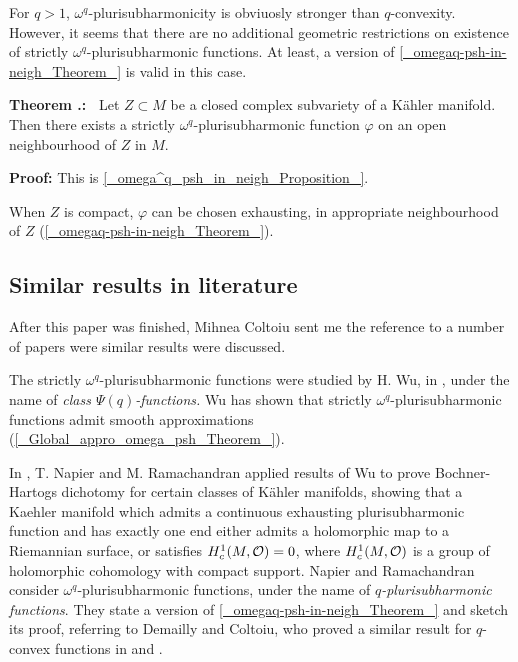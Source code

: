 \documentclass[11pt]{article}
\numberwithin{equation}{section}
\newcommand{\6}{\partial}
\renewcommand{\c}[1]{{\cal #1}}
\newcommand{\calo}{{\cal O}}
\renewcommand{\phi}{\varphi}
\newcounter{Mycounter}[section]
\newcounter{theorem}[section]
\renewcommand{\thetheorem}{{Theorem \thesection.\arabic{theorem}}}
\newcommand{\theorem}{%
    \setcounter{theorem}{\value{Mycounter}}
    \refstepcounter{theorem}
    \stepcounter{Mycounter}
    {\noindent \bf \thetheorem:\ }}
\def\blacksquare{\hbox{\vrule width 5pt height 5pt depth 0pt}}
\def\endproof{\blacksquare}
\begin{document}
For $q>1$, $\omega^q$-plurisubharmonicity is obviuosly 
stronger than $q$-convexity. However, it seems that there
are no additional geometric restrictions on existence
of strictly $\omega^q$-plurisubharmonic functions. At least,
a version of \ref{_omegaq-psh-in-neigh_Theorem_} is 
valid in this case.

\hfill

\theorem
Let $Z\subset M$ be a closed complex subvariety of a 
K\"ahler manifold. Then there exists a strictly $\omega^q$-plurisubharmonic 
function $\phi$ on an open neighbourhood of $Z$ in $M$.

\hfill

{\bf Proof:} This is \ref{_omega^q_psh_in_neigh_Proposition_}.
\endproof 

\hfill

When $Z$ is compact, $\phi$ can be chosen exhausting,
in appropriate neighbourhood of $Z$ (\ref{_omegaq-psh-in-neigh_Theorem_}). 


\subsection{Similar results in literature}

After this paper was finished, Mihnea Col\c toiu
sent me the reference to a number of papers
were similar results were discussed.

The strictly $\omega^q$-plurisubharmonic functions
were studied by H. Wu, in \cite{_Wu:q_complete_},
under the name of {\em class $\Psi(q)$-functions.}
Wu has shown that strictly $\omega^q$-plurisubharmonic functions
admit smooth approximations (\ref{_Global_appro_omega_psh_Theorem_}).

In \cite{_Napier_Ramachandran_}, T. Napier and M. Ramachandran
applied results of Wu to prove Bochner-Hartogs dichotomy
for certain classes of K\"ahler manifolds, showing that a Kaehler
manifold which admits a continuous exhausting plurisubharmonic 
function and has exactly one end either admits a holomorphic
map to a Riemannian surface, or satisfies $H^1_c(M, \calo)=0$,
where $H^1_c(M, \calo)$ is a group of holomorphic cohomology
with compact support. Napier and Ramachandran consider
$\omega^q$-plurisubharmonic functions, under the name of
{\em $q$-plurisubharmonic functions}. They state
a version of \ref{_omegaq-psh-in-neigh_Theorem_}
and sketch its proof, referring to Demailly and Col\c toiu, who proved a
similar result for $q$-convex functions in 
\cite{_Demailly:q-convex_} and \cite{_Coltoiu_}. 
\end{document}
